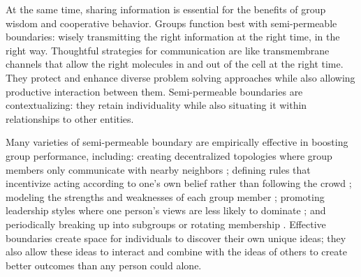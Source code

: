 \documentclass[12pt]{article}
\begin{document}
At the same time, sharing information is essential for the benefits of group wisdom and cooperative behavior. Groups function best with semi-permeable boundaries: wisely transmitting the right information at the right time, in the right way. Thoughtful strategies for communication are like transmembrane channels that allow the right molecules in and out of the cell at the right time. They protect and enhance diverse problem solving approaches while also allowing productive interaction between them. Semi-permeable boundaries are contextualizing: they retain individuality while also situating it within relationships to other entities. 

Many varieties of semi-permeable boundary are empirically effective in boosting group performance, including: creating decentralized topologies where group members only communicate with nearby neighbors \citep{becker2017network, mason2008propagation}; defining rules that incentivize acting according to one's own belief rather than following the crowd \citep{hung2001information, bazazi2019self}; modeling the strengths and weaknesses of each group member \citep{welinder2010multidimensional}; promoting leadership styles where one person's views are less likely to dominate \citep{flowers1977laboratory, leana1985partial}; and periodically breaking up into subgroups or rotating membership \citep{janis1972victims, hauer2021science, trainer2020team, straus2011group, feldman1994whos, sutton1987selecting, kane2005knowledge, wu2022membership, owen2019avoid, vafeas2003length, bebchuk2005costs, baron2005so}. Effective boundaries create space for individuals to discover their own unique ideas; they also allow these ideas to interact and combine with the ideas of others to create better outcomes than any person could alone.




\end{document}
